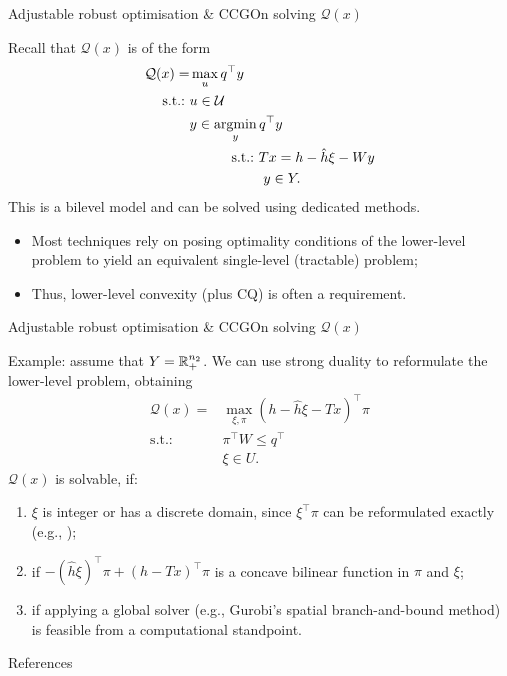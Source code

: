 \begin{frame}{Adjustable robust optimisation \& CCG}{On solving $\mathcal{Q}(x)$}

	Recall that $\mathcal{Q}(x)$  is of the form
	\begin{align*}
	\mathcal{Q}(x)	 = &\max_u q^\top y    \\
	   \st &u \in \mathcal{U}  \\ 	 
		   &y \in \argmin_y q^\top y \\
	       &\qquad \quad \text{s.t.:~} Tx = h - \hat{h} \xi - Wy \\
	       &\qquad \quad \phantom{~\text{s.t.:~}} y \in Y. 
	\end{align*}
	\pause
	This is a \alert{bilevel model} and can be solved using dedicated methods.
	\vspace{-6pt}
	\begin{itemize}
		\item Most techniques rely on \alert{posing optimality conditions} of the lower-level problem to yield an \alert{equivalent single-level} (tractable) problem;
		\item Thus, \alert{lower-level convexity} (plus CQ) is often a requirement.
	\end{itemize}

\end{frame}


\begin{frame}{Adjustable robust optimisation \& CCG}{On solving $\mathcal{Q}(x)$}

	Example: assume that $Y = \mathbb R_+^{n_2}$. We can use strong duality to reformulate the lower-level problem, obtaining
	\begin{align*}
		\mathcal{Q}(x) = &\max_{\xi,\pi} (h - \hat{h} \xi - Tx)^\top \pi \\
		   \text{s.t.:~} & \pi^\top W \leq q^\top \\
		   	   & \xi \in U.	 
	\end{align*}
	$\mathcal{Q}(x)$ is solvable, if:
	\vspace{-6pt} 
	\begin{enumerate}
		\item $\xi$ is integer or has a discrete domain, since $\xi^\top \pi$ can be reformulated exactly (e.g., {\small \cite{rintamaki2023achieving}});
		\item if $-(\hat{h}\xi)^\top \pi + (h - Tx)^\top \pi$ is a \alert{concave bilinear} function in $\pi$ and $\xi$;
		\item if applying a \alert{global solver} (e.g., Gurobi's spatial branch-and-bound method) is feasible from a computational standpoint.	
	\end{enumerate}

	
\end{frame}

\begin{frame}[allowframebreaks]{References}
	
	
\end{frame}

